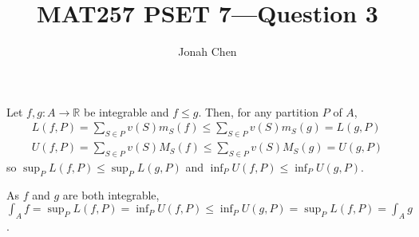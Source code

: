 \documentclass{exam}
\title{MAT257 PSET 7---Question 3}
\author{Jonah Chen}
\numberwithin{equation}{section}
\newcommand{\R}{\mathbb{R}}
\begin{document}
    \sffamily
    \maketitle
    Let $f,g:A\to\R$ be integrable and $f\leq g$. Then, for any partition $P$ of $A$,
    \begin{align*}
        L(f,P)=\sum_{S\in P}v(S)m_S(f)\leq\sum_{S\in P}v(S)m_S(g)=L(g,P)\\
        U(f,P)=\sum_{S\in P}v(S)M_S(f)\leq\sum_{S\in P}v(S)M_S(g)=U(g,P)
    \end{align*}
    so $\sup_PL(f,P)\leq \sup_PL(g,P)$ and $\inf_PU(f,P)\leq\inf_PU(g,P)$.

    As $f$ and $g$ are both integrable, $\int_Af=\sup_PL(f,P)=\inf_PU(f,P)\leq\inf_PU(g,P)=\sup_PL(f,P)=\int_Ag$.
\end{document}
